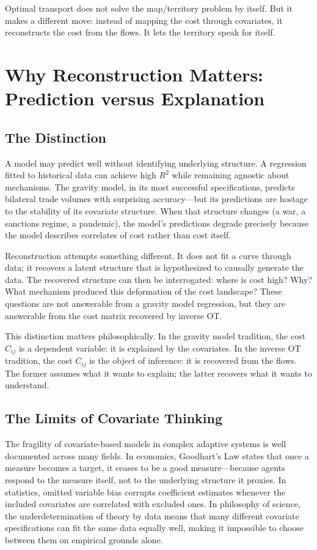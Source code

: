 \documentclass[12pt]{article}
\begin{document}
Optimal transport does not solve the map/territory problem by itself. But it makes a different move: instead of mapping the cost through covariates, it reconstructs the cost from the flows. It lets the territory speak for itself.

\section{Why Reconstruction Matters: Prediction versus Explanation}

\subsection{The Distinction}

A model may predict well without identifying underlying structure. A regression fitted to historical data can achieve high $R^2$ while remaining agnostic about mechanisms. The gravity model, in its most successful specifications, predicts bilateral trade volumes with surprising accuracy---but its predictions are hostage to the stability of its covariate structure. When that structure changes (a war, a sanctions regime, a pandemic), the model's predictions degrade precisely because the model describes correlates of cost rather than cost itself.

Reconstruction attempts something different. It does not fit a curve through data; it recovers a latent structure that is hypothesized to causally generate the data. The recovered structure can then be interrogated: where is cost high? Why? What mechanism produced this deformation of the cost landscape? These questions are not answerable from a gravity model regression, but they are answerable from the cost matrix recovered by inverse OT.

This distinction matters philosophically. In the gravity model tradition, the cost $C_{ij}$ is a dependent variable: it is explained by the covariates. In the inverse OT tradition, the cost $C_{ij}$ is the object of inference: it is recovered from the flows. The former assumes what it wants to explain; the latter recovers what it wants to understand.

\subsection{The Limits of Covariate Thinking}

The fragility of covariate-based models in complex adaptive systems is well documented across many fields. In economics, Goodhart's Law states that once a measure becomes a target, it ceases to be a good measure---because agents respond to the measure itself, not to the underlying structure it proxies. In statistics, omitted variable bias corrupts coefficient estimates whenever the included covariates are correlated with excluded ones. In philosophy of science, the underdetermination of theory by data means that many different covariate specifications can fit the same data equally well, making it impossible to choose between them on empirical grounds alone.
\end{document}
